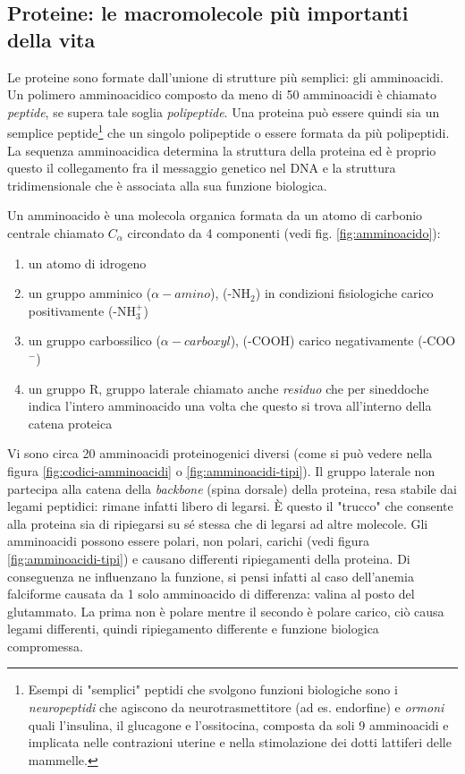 \subsection{Proteine: le macromolecole più importanti della vita}

Le proteine sono formate dall'unione di strutture più semplici: gli amminoacidi. Un polimero amminoacidico composto da meno di 50 amminoacidi è chiamato \textit{peptide}, se supera tale soglia \textit{polipeptide}. Una proteina può essere quindi sia un semplice peptide\footnote{Esempi di "semplici" peptidi che svolgono funzioni biologiche sono i \textit{neuropeptidi} che agiscono da neurotrasmettitore (ad es. endorfine) e \textit{ormoni} quali l'insulina, il glucagone e l'ossitocina, composta da soli 9 amminoacidi e implicata nelle contrazioni uterine e nella stimolazione dei dotti lattiferi delle mammelle.} che un singolo polipeptide o essere formata da più polipeptidi. La sequenza amminoacidica determina la struttura della proteina ed è proprio questo il collegamento fra il messaggio genetico nel DNA e la struttura tridimensionale che è associata alla sua funzione biologica. 

\par Un amminoacido è una molecola organica formata da un atomo di carbonio centrale chiamato $C_{\alpha}$ circondato da 4 componenti (vedi fig. \ref{fig:amminoacido}):
\begin{enumerate}
	\item un atomo di idrogeno
	\item un gruppo amminico ($\alpha-amino$), (-NH$_{2}$) in condizioni fisiologiche carico positivamente (-NH$_{3}^{+}$) 
	\item un gruppo carbossilico ($\alpha-carboxyl$), (-COOH) carico negativamente (-COO$^{-}$)
	\item un gruppo R, gruppo laterale chiamato anche \textit{residuo} che per sineddoche indica l'intero amminoacido una volta che questo si trova all'interno della catena proteica
\end{enumerate}

Vi sono circa 20 amminoacidi proteinogenici diversi (come si può vedere nella figura \ref{fig:codici-amminoacidi} o \ref{fig:amminoacidi-tipi}). Il gruppo laterale non partecipa alla catena della \textit{backbone} (spina dorsale) della proteina, resa stabile dai legami peptidici: rimane infatti libero di legarsi. È questo il "trucco" che consente alla proteina sia di ripiegarsi su sé stessa che di legarsi ad altre molecole. Gli amminoacidi possono essere polari, non polari, carichi (vedi figura \ref{fig:amminoacidi-tipi}) e causano differenti ripiegamenti della proteina. Di conseguenza ne influenzano la funzione, si pensi infatti al caso dell'anemia falciforme causata da 1 solo amminoacido di differenza: valina al posto del glutammato. La prima non è polare mentre il secondo è polare carico, ciò causa legami differenti, quindi ripiegamento differente e funzione biologica compromessa. 

